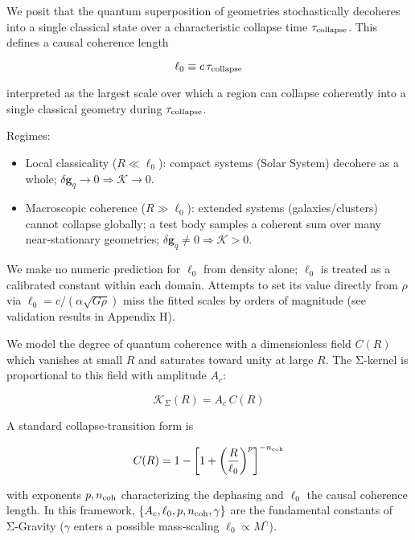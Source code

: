 \documentclass[11pt,a4paper]{article}
\begin{document}
We posit that the quantum superposition of geometries stochastically decoheres into a single classical state over a characteristic collapse time $\tau_{\rm collapse}$. This defines a causal coherence length


\begin{equation}
\ell_0 \equiv c\,\tau_{\rm collapse}
\end{equation}


interpreted as the largest scale over which a region can collapse coherently into a single classical geometry during $\tau_{\rm collapse}$.


Regimes:

\begin{itemize}
\item Local classicality ($R\ll\ell_0$): compact systems (Solar System) decohere as a whole; $\delta\mathbf{g}_q\to0\Rightarrow \mathcal{K}\to0$.
\item Macroscopic coherence ($R\gg\ell_0$): extended systems (galaxies/clusters) cannot collapse globally; a test body samples a coherent sum over many near‑stationary geometries; $\delta\mathbf{g}_q\ne0\Rightarrow \mathcal{K}>0$.
\end{itemize}


We make no numeric prediction for $\ell_0$ from density alone; $\ell_0$ is treated as a calibrated constant within each domain. Attempts to set its value directly from $\rho$ via $\ell_0 = c/(\alpha\sqrt{G\rho})$ miss the fitted scales by orders of magnitude (see validation results in Appendix H).


We model the degree of quantum coherence with a dimensionless field $C(R)$ which vanishes at small $R$ and saturates toward unity at large $R$. The Σ‑kernel is proportional to this field with amplitude $A_c$:


\begin{equation}
\mathcal{K}_\Sigma(R) = A_c\,C(R)
\end{equation}


A standard collapse‑transition form is


\begin{equation}
C(R) = 1 - \left[1 + \left(\frac{R}{\ell_0}\right)^p\right]^{-n_{\rm coh}}
\end{equation}


with exponents $p,n_{\rm coh}$ characterizing the dephasing and $\ell_0$ the causal coherence length. In this framework, $\{A_c,\ell_0,p,n_{\rm coh},\gamma\}$ are the fundamental constants of Σ‑Gravity ($\gamma$ enters a possible mass‑scaling $\ell_0\propto M^{\gamma}$).
\end{document}
